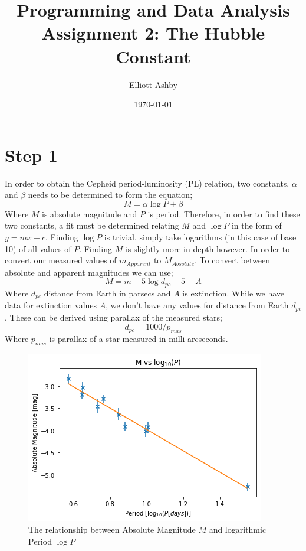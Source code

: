 \documentclass{article}
\title{Programming and Data Analysis Assignment 2: The Hubble Constant}
\author{Elliott Ashby}
\date{\today}
\begin{document}
    \maketitle

    \section{Step 1}
    In order to obtain the Cepheid period-luminosity (PL) relation, two constants, $\alpha$ and $\beta$ needs to be determined
    to form the equation;
    \begin{equation}
        M = \alpha \log P + \beta
    \end{equation}
    Where $M$ is absolute magnitude and $P$ is period. \newline
    Therefore, in order to find these two constants, a fit must be determined relating $M$ and $\log P$ in the form of $y = mx + c$. \newline
    \newline
    Finding $\log P$ is trivial, simply take logarithms (in this case of base 10) of all values of $P$. \newline
    Finding $M$ is slightly more in depth however. In order to convert our measured values of $m_{Apparent}$ to $M_{Absolute}$. \newline
    To convert between absolute and apparent magnitudes we can use;
    \begin{equation}
        M = m - 5 \log d_{pc} + 5 - A
    \end{equation}
    Where $d_{pc}$ distance from Earth in parsecs and $A$ is extinction. \newline
    While we have data for extinction values $A$, we don't have any values for distance from Earth $d_{pc}$. 
    These can be derived using parallax of the measured stars;
    \begin{equation}
        d_{pc} = 1000 / p_{mas}
    \end{equation}
    Where $p_{mas}$ is parallax of a star measured in milli-arcseconds. \newline
    \newline
    \begin{figure}
        \centering
        \includegraphics[scale = 0.7]{../media/images/part1.png}
        \caption{The relationship between Absolute Magnitude $M$ and logarithmic Period $\log P$}
    \end{figure}
\end{document}
